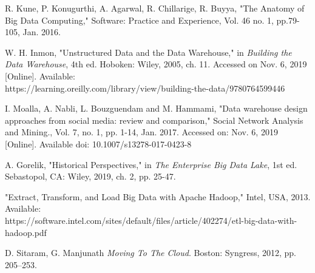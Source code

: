 \documentclass[journal]{IEEEtran}
\begin{document}
\begin{thebibliography}{1}

R. Kune, P. Konugurthi, A. Agarwal, R. Chillarige, R. Buyya,
 "The Anatomy of Big Data Computing," Software: Practice and Experience,
 Vol. 46 no. 1, pp.79-105, Jan. 2016. 

W. H. Inmon, "Unstructured Data and the Data Warehouse," in 
  \emph{Building the Data Warehouse},
  4th ed. Hoboken: Wiley, 2005, ch. 11.
  Accessed on Nov. 6, 2019 [Online]. 
  Available: \\ https://learning.oreilly.com/library/view/building-the-data/9780764599446

I. Moalla, A. Nabli, L. Bouzguendam and M. Hammami,
 "Data warehouse design approaches from social media: review and comparison,"
 Social Network Analysis and Mining., Vol. 7, no. 1, pp. 1-14, Jan. 2017.
 Accessed on: Nov. 6, 2019 [Online]. 
 Available doi: 10.1007/s13278-017-0423-8

A. Gorelik, "Historical Perspectives," in 
 \emph{The Enterprise Big Data Lake},
 1st ed. Sebastopol, CA: Wiley, 2019, ch. 2, pp. 25-47.

"Extract, Transform, and Load Big Data with Apache Hadoop," Intel, USA, 2013.
 Available:\\ https://software.intel.com/sites/default/files/article/402274/etl-big-data-with-hadoop.pdf

D. Sitaram, G. Manjunath \textit{Moving To The Cloud}. Boston: Syngress, 2012, pp. 205–253.

\end{thebibliography}


\end{document}

